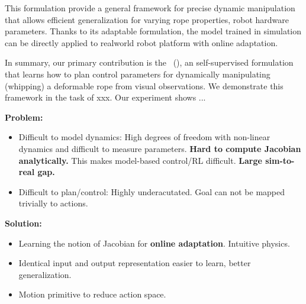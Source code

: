 \begin{itemize}[leftmargin=3mm]
\end{itemize}

This formulation provide a  general framework for precise dynamic manipulation that allows  efficient generalization for varying rope properties, robot hardware parameters.  Thanks to its adaptable formulation, the model trained in simulation can be directly applied to realworld robot platform with online adaptation.  

In summary, our  primary contribution is the \namel~(\names), an self-supervised formulation that learns how to plan control parameters  for dynamically manipulating (whipping) a deformable rope  from visual observations. 
We demonstrate this framework in the task of xxx. 
Our experiment shows ... 


\iffalse
\textbf{Problem:}
\begin{itemize}    
    \item{Difficult to model dynamics}: High degrees of freedom with non-linear dynamics and difficult to measure parameters. \textbf{Hard to compute Jacobian analytically.} This makes model-based control/RL difficult. \textbf{Large sim-to-real gap.}
    
    \item{Difficult to plan/control}: Highly underacutated. Goal can not be mapped trivially to actions.
\end{itemize}

\textbf{Solution:}
\begin{itemize}
    \item{Learning the notion of Jacobian} for \textbf{online adaptation}. Intuitive physics.
    \item{Identical input and output representation} easier to learn, better generalization.
    \item{Motion primitive} to reduce action space.
\end{itemize}


